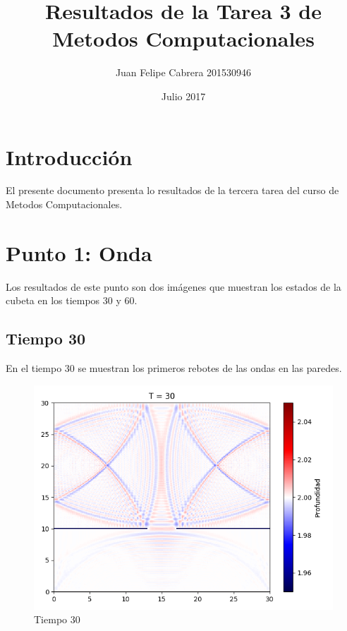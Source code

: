 \documentclass{article}
\title{Resultados de la Tarea 3 de Metodos Computacionales}
\author{Juan Felipe Cabrera 201530946}
\date{Julio 2017}
\begin{document}
\maketitle
{}

\section{Introducción}
El presente documento presenta lo resultados de la tercera tarea del curso de Metodos Computacionales.
\section{Punto 1: Onda}
Los resultados de este punto son dos imágenes que muestran los estados de la cubeta en los tiempos 30 y 60.
\subsection{Tiempo 30}
En el tiempo 30 se muestran los primeros rebotes de las ondas en las paredes.
\begin{figure}[H]
\centering
\includegraphics[scale=0.5]{30.png}
\caption{Tiempo 30}
\end{figure}
\newpage
\end{document}

